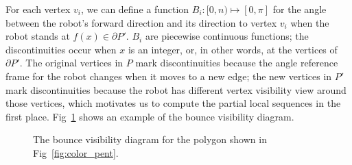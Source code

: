 \documentclass[letterpaper, 10 pt, conference]{ieeeconf}  %
\begin{document}
For each vertex $v_i$, we can define a function $B_i: [0, n) \mapsto [0, \pi]$ for the angle between the robot's forward direction and its direction to vertex  $v_i$ when the robot stands at $f(x)\in \partial P'$. $B_i$ are piecewise continuous functions; the discontinuities occur when $x$ is an integer, or, in other words, at the vertices of $\partial P'$. The original vertices in $P$ mark discontinuities because the angle reference frame for the robot changes when it moves to a new edge; the new vertices in $P'$ mark discontinuities because the robot has different vertex visibility view around those vertices, which motivates us to compute the partial local sequences in the first place. Fig~\ref{fig:bvd} shows an example of the bounce visibility diagram. 
\begin{figure}
\centering
{}
\caption{The bounce visibility diagram for the polygon shown in Fig~\ref{fig:color_pent}. }
\label{fig:bvd}

\end{figure}
\end{document}
